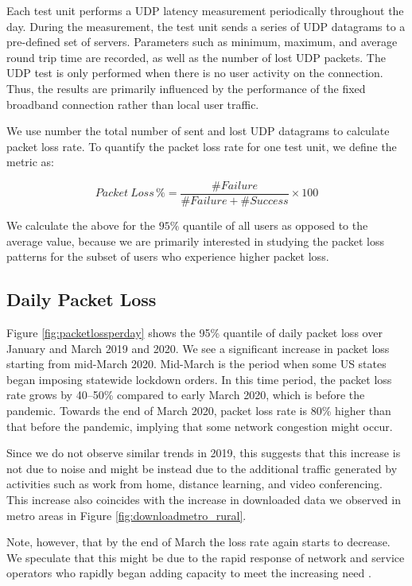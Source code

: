Each test unit performs a UDP latency measurement periodically throughout the day. During the measurement, the test unit sends a series of UDP datagrams to a pre-defined set of servers. Parameters such as minimum, maximum, and average round  trip time are recorded, as well as the number of lost UDP packets. The UDP test is only performed when there is no user activity on the connection. Thus, the results are primarily influenced by the performance of the fixed broadband connection rather than local user traffic.

We use number the total number of sent and lost UDP datagrams to calculate packet loss rate. To quantify the packet loss rate for one test unit, we define the metric as:

\begin{equation}
    Packet \ Loss\, \% = \frac{\#Failure }{\#Failure + \#Success} \times 100
\end{equation}

We calculate the above for the $95\%$ quantile of all users as opposed to the average value, because we are primarily interested in studying the packet loss patterns for the subset of users who experience higher packet loss.

\subsection{Daily Packet Loss}

Figure \ref{fig:packetlossperday} shows the 95\% quantile of daily packet loss over January and March 2019 and 2020. We see a significant increase in packet loss starting from mid-March 2020. Mid-March is the period when some US states began imposing statewide lockdown orders. In this time period, the packet loss rate grows by 40--50\% compared to early March 2020, which is before the pandemic. Towards the end of March 2020, packet loss rate is 80\% higher than that before the pandemic, implying that some network congestion might occur.

Since we do not observe similar trends in 2019, this suggests that this increase is not due to noise and might be instead due to the additional traffic generated by activities such as work from home, distance learning, and video conferencing. This increase also coincides with the increase in downloaded data we observed in metro areas in Figure \ref{fig:downloadmetro_rural}.

Note, however, that by the end of March the loss rate again starts to decrease. We speculate that this might be due to the rapid response of network and service operators who rapidly began adding capacity to meet the increasing need \cite{liu2020characterizing}.

